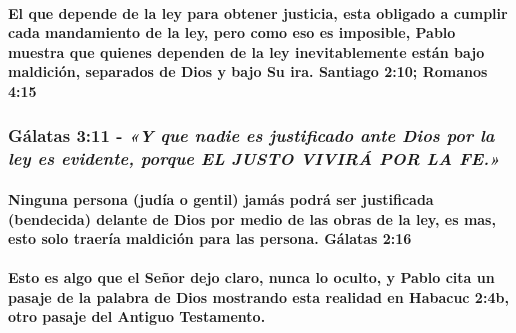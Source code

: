 \documentclass[11a pt,twoside]{article}
\newcommand{\scripture}[1]{%
  {\fontsize{12pt}{16pt}\selectfont\ScriptureFont\itshape #1}%
}
\let\oldsubsubsection\subsubsection
\renewcommand{\subsubsection}{\needspace{4\baselineskip}\oldsubsubsection}
\let\oldparagraph\paragraph
\renewcommand{\paragraph}{\needspace{3\baselineskip}\oldparagraph}
\begin{document}
\paragraph{El que depende de la ley para obtener justicia, esta obligado
a cumplir cada mandamiento de la ley, pero como eso es imposible, Pablo
muestra que quienes dependen de la ley inevitablemente están bajo
maldición, separados de Dios y bajo Su ira. Santiago 2:10; Romanos
4:15}\label{el-que-depende-de-la-ley-para-obtener-justicia-esta-obligado-a-cumplir-cada-mandamiento-de-la-ley-pero-como-eso-es-imposible-pablo-muestra-que-quienes-dependen-de-la-ley-inevitablemente-estuxe1n-bajo-maldiciuxf3n-separados-de-dios-y-bajo-su-ira.-santiago-210-romanos-415}

\subsubsection{\texorpdfstring{Gálatas 3:11 -
\scripture{«Y que nadie es justificado ante Dios por la ley es evidente, porque EL JUSTO VIVIRÁ POR LA FE.»}}{Gálatas 3:11 - }}\label{guxe1latas-311---y-que-nadie-es-justificado-ante-dios-por-la-ley-es-evidente-porque-el-justo-viviruxe1-por-la-fe.}

\paragraph{Ninguna persona (judía o gentil) jamás podrá ser justificada
(bendecida) delante de Dios por medio de las obras de la ley, es mas,
esto solo traería maldición para las persona. Gálatas
2:16}\label{ninguna-persona-juduxeda-o-gentil-jamuxe1s-podruxe1-ser-justificada-bendecida-delante-de-dios-por-medio-de-las-obras-de-la-ley-es-mas-esto-solo-traeruxeda-maldiciuxf3n-para-las-persona.-guxe1latas-216}

\paragraph{Esto es algo que el Señor dejo claro, nunca lo oculto, y
Pablo cita un pasaje de la palabra de Dios mostrando esta realidad en
Habacuc 2:4b, otro pasaje del Antiguo
Testamento.}\label{esto-es-algo-que-el-seuxf1or-dejo-claro-nunca-lo-oculto-y-pablo-cita-un-pasaje-de-la-palabra-de-dios-mostrando-esta-realidad-en-habacuc-24b-otro-pasaje-del-antiguo-testamento.}
\end{document}
